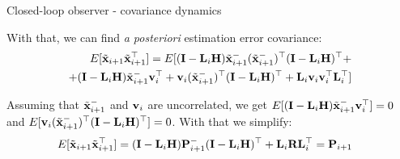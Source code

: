 \documentclass{beamer}
\newcommand{\btil}[1] {\Tilde{\mathbf{#1}}}
\begin{document}
\begin{frame}{Closed-loop observer - covariance dynamics}
	\begin{flushleft}
		
		
		With that, we can find \emph{a posteriori} estimation error covariance:
		\begin{align*}
			E[\btil{x}_{i+1} \btil{x}_{i+1}\T] 
			=
			E[ (\bo{I} - \bo{L}_i \bo{H}) \btil{x}_{i+1}^- (\btil{x}_{i+1}^-)\T (\bo{I} - \bo{L}_i \bo{H})\T + \\
			+(\bo{I} - \bo{L}_i \bo{H}) \btil{x}_{i+1}^- \bo{v}_i\T +
			\bo{v}_i (\btil{x}_{i+1}^-)\T (\bo{I} - \bo{L}_i \bo{H})\T +
			\bo{L}_i \bo{v}_i \bo{v}_i\T \bo{L}_i\T]
		\end{align*}
		
		Assuming that $\btil{x}_{i+1}^-$ and $\mathbf{v}_i$ are uncorrelated, we get $E[(\bo{I} - \bo{L}_i \bo{H}) \btil{x}_{i+1}^- \bo{v}_i\T] = 0$ and $E[\bo{v}_i (\btil{x}_{i+1}^-)\T (\bo{I} - \bo{L}_i \bo{H})\T] = 0$. With that we simplify:
		\begin{align*}
			E[\btil{x}_{i+1} \btil{x}_{i+1}\T] 
			&=
			(\bo{I} - \bo{L}_i \bo{H}) \bo{P}_{i+1}^- (\bo{I} - \bo{L}_i \bo{H})\T +\bo{L}_i\bo{R}\bo{L}_i\T = \bo{P}_{i+1}
		\end{align*}
		
	\end{flushleft}
\end{frame}






\begin{frame}
	\begin{flushleft}
		
		
	\end{flushleft}
\end{frame}
\end{document}
